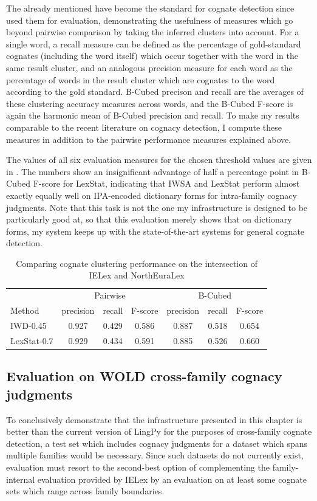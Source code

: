 The already mentioned  have become the standard for cognate detection since \cite{hauer_kondrak_2011} used them for evaluation, demonstrating the usefulness of measures which go beyond pairwise comparison by taking the inferred clusters into account. For a single word, a recall measure can be defined as the percentage of gold-standard cognates (including the word itself) which occur together with the word in the same result cluster, and an analogous precision measure for each word as the percentage of words in the result cluster which are cognates to the word according to the gold standard. B-Cubed precison and recall are the averages of these clustering accuracy measures across words, and the B-Cubed F-score is again the harmonic mean of B-Cubed precision and recall. To make my results comparable to the recent literature on cognacy detection, I compute these measures in addition to the pairwise performance measures explained above.

The values of all six evaluation measures for the chosen threshold values are given in . The numbers show an insignificant advantage of half a percentage point in B-Cubed F-score for LexStat, indicating that IWSA and LexStat perform almost exactly equally well on IPA-encoded dictionary forms for intra-family cognacy judgments. Note that this task is not the one my infrastructure is designed to be particularly good at, so that this evaluation merely shows that on dictionary forms, my system keeps up with the state-of-the-art systems for general cognate detection.

\begin{table}
\centering
\begin{tabular}{lcccccc}
\hline \hline
& \multicolumn{3}{c}{Pairwise} & \multicolumn{3}{c}{B-Cubed}\\
Method & precision & recall & F-score & precision & recall & F-score\\ \hline
IWD-0.45 & 0.927 & 0.429 & 0.586 & 0.887 & 0.518 & 0.654\\
LexStat-0.7 & 0.929 & 0.434 & 0.591 & 0.885 & 0.526 & 0.660\\
\hline
\end{tabular}
\caption{Comparing cognate clustering performance on the intersection of IELex and NorthEuraLex}
\label{lingpyComparisonIELex}
\end{table}

\subsection{Evaluation on WOLD cross-family cognacy judgments}
To conclusively demonstrate that the infrastructure presented in this chapter is better than the current version of LingPy for the purposes of cross-family cognate detection, a test set which includes cognacy judgments for a dataset which spans multiple families would be necessary. Since such datasets do not currently exist, evaluation must resort to the second-best option of complementing the family-internal evaluation provided by IELex by an evaluation on at least some cognate sets which range across family boundaries.

